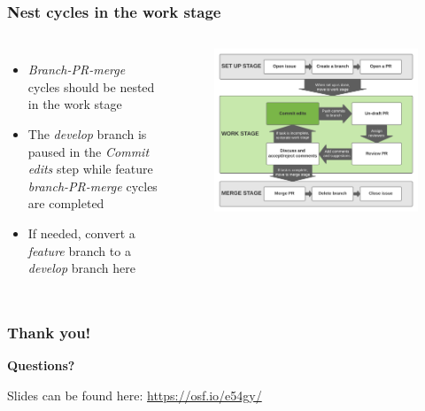 \documentclass[aspectratio=169]{beamer} %
\begin{document}
\begin{frame}
	\frametitle{Nest cycles in the work stage}
	\begin{columns}[c]

		\begin{itemize}
			\setlength\itemsep{1em}
			\item \textit{Branch-PR-merge} cycles should be nested
			in the work stage
			\item The \textit{develop} branch is paused
			in the \textit{Commit edits} step while
			feature \textit{branch-PR-merge} cycles are completed
			\item If needed, convert a \textit{feature} branch
			to a \textit{develop} branch here
		\end{itemize}

		\vspace{-.75cm}
		\begin{figure}
			\centering
			\includegraphics[width=\textwidth]{./img/branch-pr-merge-cycle-S2-1.png}
		\end{figure}
	\end{columns}
\end{frame}

\begin{frame}
	\frametitle{Thank you!}
	\huge\centering \textbf{Questions?}

	\vspace{1cm}
	\normalsize Slides can be found here: \url{https://osf.io/e54gy/}
\end{frame}
\end{document}

